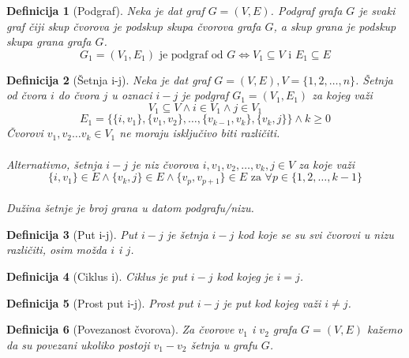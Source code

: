 \documentclass[11pt]{article}
\newtheorem{definition}{Definicija}
\begin{document}
		\begin{definition}[Podgraf]
		Neka je dat graf $G = (V, E)$. Podgraf grafa $G$ je svaki graf čiji skup čvorova je podskup skupa čvorova grafa $G$, a skup grana je podskup skupa grana grafa $G$.
		\[ G_1 = (V_1, E_1) \text{ je podgraf od } G \Leftrightarrow V_1 \subseteq V \text{ i } E_1 \subseteq E \]
		\end{definition}
	
		\begin{definition}[Šetnja i-j]
		Neka je dat graf $G = (V, E), V = \{1, 2, \dots, n\}$. Šetnja od čvora $i$ do čvora $j$ u oznaci $i-j$ je podgraf $G_1 = (V_1, E_1)$ za kojeg važi 
		\[
		 	V_1 \subseteq V \land  i \in V_1 \land j \in V_1
		\]
		\[ 
		 	E_1 = \{\{i,v_1\},\{v_1,v_2\},\dots,\{v_{k-1},v_k\},\{v_k,j\}\} \land k \geq 0
		\] 
		Čvorovi $v_1,v_2 \dots v_k \in V_1 $ ne moraju isključivo biti različiti.
			\paragraph{}
			Alternativno, šetnja $i-j$ je niz čvorova $i, v_1, v_2, \dots, v_k, j \in V$ za koje važi 
			\[
				\{i,v_1\} \in E \land \{v_k,j\} \in E \land \{v_p,v_{p+1}\} \in E \text{ za } \forall p \in \{1,2, \dots, k-1\} 
			\]
			\paragraph{}
			Dužina šetnje je broj grana u datom podgrafu/nizu.
		\end{definition}
	
		\begin{definition}[Put i-j]
		Put $i-j$ je šetnja $i-j$ kod koje se su svi čvorovi u nizu različiti, osim možda $i$ i $j$.
		\end{definition}
		
		\begin{definition}[Ciklus i]
		Ciklus je put $i-j$ kod kojeg je $i=j$.
		\end{definition}
		
		\begin{definition}[Prost put i-j]
		Prost put $i-j$ je put kod kojeg važi $i \neq j$.
		\end{definition}
	
		\begin{definition}[Povezanost čvorova]
		Za čvorove $v_1$ i $v_2$ grafa $G = (V, E)$ kažemo da su povezani ukoliko postoji $v_1-v_2$ šetnja u grafu $G$. 
		\end{definition}
	
\end{document}
